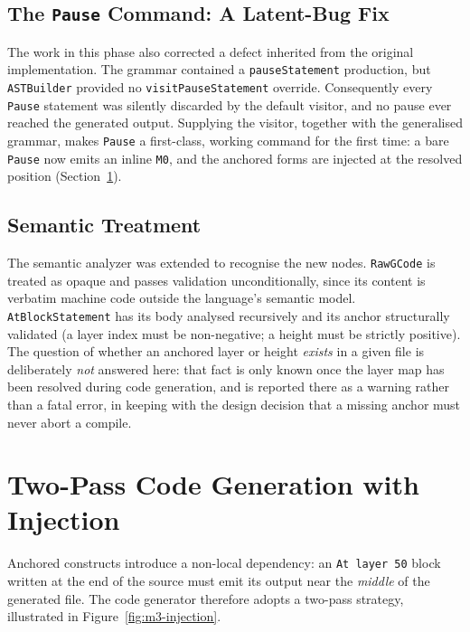 \subsection*{The \texttt{Pause} Command: A Latent-Bug Fix}

The work in this phase also corrected a defect inherited from the original implementation. The grammar contained a \texttt{pauseStatement} production, but \texttt{ASTBuilder} provided no \texttt{visitPauseStatement} override. Consequently every \texttt{Pause} statement was silently discarded by the default visitor, and no pause ever reached the generated output. Supplying the visitor, together with the generalised grammar, makes \texttt{Pause} a first-class, working command for the first time: a bare \texttt{Pause} now emits an inline \texttt{M0}, and the anchored forms are injected at the resolved position (Section~\ref{sec:m3-injection}).

\subsection*{Semantic Treatment}

The semantic analyzer was extended to recognise the new nodes. \texttt{RawGCode} is treated as opaque and passes validation unconditionally, since its content is verbatim machine code outside the language's semantic model. \texttt{AtBlockStatement} has its body analysed recursively and its anchor structurally validated (a layer index must be non-negative; a height must be strictly positive). The question of whether an anchored layer or height \emph{exists} in a given file is deliberately \emph{not} answered here: that fact is only known once the layer map has been resolved during code generation, and is reported there as a warning rather than a fatal error, in keeping with the design decision that a missing anchor must never abort a compile.

\section{Two-Pass Code Generation with Injection}
\label{sec:m3-injection}

Anchored constructs introduce a non-local dependency: an \texttt{At layer 50} block written at the end of the source must emit its output near the \emph{middle} of the generated file. The code generator therefore adopts a two-pass strategy, illustrated in Figure~\ref{fig:m3-injection}.

